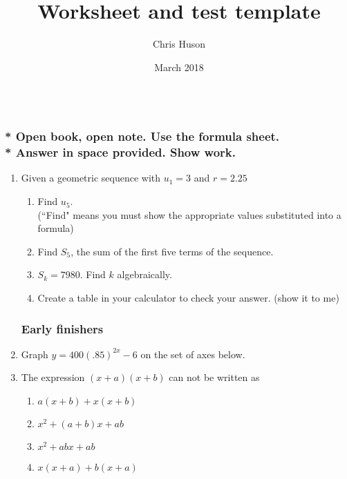 \documentclass[12pt, oneside]{article}
\title{Worksheet and test template}
\author{Chris Huson}
\date{March 2018}
\begin{document}
\subsubsection*{\\* Open book, open note. Use the formula sheet. \\* Answer in space provided. Show work.}

\begin{enumerate}

\vspace{0.5 cm}

\subsubsection*{Geometric sequence and series}

\item Given a geometric sequence with $u_1=3$ and $r=2.25$
  \begin{enumerate}
      \item Find $u_5$. \\
      (``Find" means you must show the appropriate values substituted into a formula)\\[95pt]
      \item Find $S_5$, the sum of the first five terms of the sequence.\\[145pt]
      \item $S_k=7980$. Find $k$ algebraically.\\[145pt]
      \item Create a table in your calculator to check your answer. (show it to me)
  \end{enumerate}

\newpage
\subsubsection*{Early finishers}

\item Graph $y=400(.85)^{2x}-6$ on the set of axes below.
\begin{center}
\end{center} %

\item The expression $(x + a)(x + b)$ can not be written as
\begin{enumerate}
    \item $a(x + b)+ x(x + b)$
    \item $x^2 + (a + b)x + ab$ 
    \item  $x^2 + abx + ab$  
    \item $x(x + a)+ b(x + a)$
\end{enumerate}

\end{enumerate}
\end{document}
